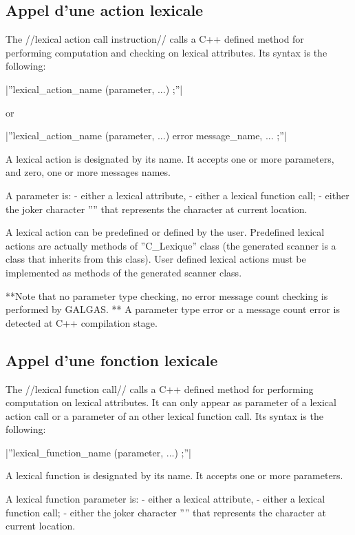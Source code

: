 \subsection{Appel d'une action lexicale}

The //lexical action call instruction// calls a C++ defined method for performing computation and checking on lexical attributes. Its syntax is the following:

|''lexical\_action\_name (parameter, ...) ;''|

or

|''lexical\_action\_name (parameter, ...) error message\_name, ... ;''|

A lexical action is designated by its name. It accepts one or more parameters, and zero, one or more messages names.

A parameter is:
  - either a lexical attribute,
  - either a lexical function call;
  - either the joker character ''\textquotesingle*\textquotesingle'' that represents the character at current location.

A lexical action can be predefined or defined by the user. Predefined lexical actions are actually methods of ''C\_Lexique'' class (the generated scanner is a class that inherits from this class). User defined lexical actions must be implemented as methods of the generated scanner class.

**Note that no parameter type checking, no error message count checking is performed by GALGAS. ** A parameter type error or a message count error is detected at C++ compilation stage.
 
\subsection{Appel d'une fonction lexicale}

The //lexical function call// calls a C++ defined method for performing computation on lexical attributes. It can only appear as parameter of a lexical action call or a parameter of an other lexical function call. Its syntax is the following:

|''lexical\_function\_name (parameter, ...) ;''|

A lexical function is designated by its name. It accepts one or more parameters.

A lexical function parameter is:
  - either a lexical attribute,
  - either a lexical function call;
  - either the joker character ''\textquotesingle*\textquotesingle'' that represents the character at current location.

